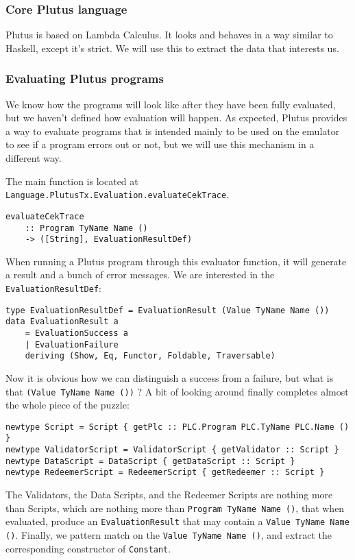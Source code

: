\documentclass{article}
\begin{document}
\subsubsection{Core Plutus language}
Plutus is based on Lambda Calculus. It looks and behaves in a way similar to Haskell, except it's strict. We will use this to extract the data that interests us.

\subsubsection{Evaluating Plutus programs}
We know how the programs will look like after they have been fully evaluated, but we haven't defined how evaluation will happen. As expected, Plutus provides a way to evaluate programs that is intended mainly to be used on the emulator to see if a program errors out or not, but we will use this mechanism in a different way.

The main function is located at \verb|Language.PlutusTx.Evaluation.evaluateCekTrace|.

\begin{verbatim}
evaluateCekTrace
    :: Program TyName Name ()
    -> ([String], EvaluationResultDef)
\end{verbatim}

When running a Plutus program through this evaluator function, it will generate a result and a bunch of error messages. We are interested in the \verb|EvaluationResultDef|:
\nopagebreak

\begin{verbatim}
type EvaluationResultDef = EvaluationResult (Value TyName Name ())
data EvaluationResult a
    = EvaluationSuccess a
    | EvaluationFailure
    deriving (Show, Eq, Functor, Foldable, Traversable)
\end{verbatim}

Now it is obvious how we can distinguish a success from a failure, but what is that \verb|(Value TyName Name ())| ? A bit of looking around finally completes almost the whole piece of the puzzle:
\nopagebreak

\begin{verbatim}
newtype Script = Script { getPlc :: PLC.Program PLC.TyName PLC.Name () }
newtype ValidatorScript = ValidatorScript { getValidator :: Script }
newtype DataScript = DataScript { getDataScript :: Script }
newtype RedeemerScript = RedeemerScript { getRedeemer :: Script }
\end{verbatim}

The Validators, the Data Scripts, and the Redeemer Scripts are nothing more than Scripts, which are nothing more than \verb|Program TyName Name ()|, that when evaluated, produce an \verb|EvaluationResult| that may contain a \verb|Value TyName Name ()|. Finally, we pattern match on the \verb|Value TyName Name ()|, and extract the corresponding constructor of \verb|Constant|.
\end{document}
